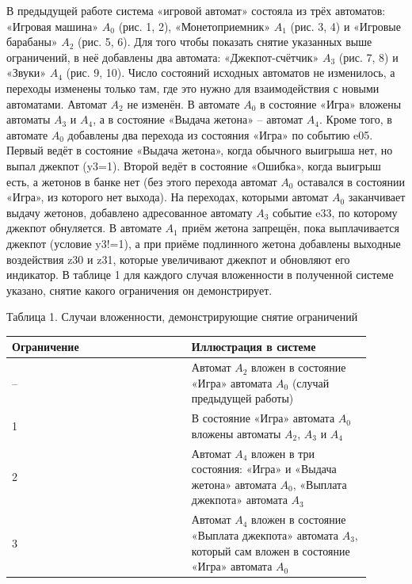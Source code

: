 \documentclass[12pt]{article}
\begin{document}
В предыдущей работе система «игровой автомат» состояла из трёх автоматов: «Игровая машина» $A_{0}$ (рис. 1, 2), «Монетоприемник» $A_{1}$ (рис. 3, 4) и «Игровые барабаны» $A_{2}$ (рис. 5, 6). Для того чтобы показать снятие указанных выше ограничений, в неё добавлены два автомата: «Джекпот-счётчик» $A_{3}$ (рис. 7, 8) и «Звуки» $A_{4}$ (рис. 9, 10). Число состояний исходных автоматов не изменилось, а переходы изменены только там, где это нужно для взаимодействия с новыми автоматами. Автомат $A_{2}$ не изменён. В автомате $A_{0}$ в состояние «Игра» вложены автоматы $A_{3}$ и $A_{4}$, а в состояние «Выдача жетона» – автомат $A_{4}$. Кроме того, в автомате $A_{0}$ добавлены два перехода из состояния «Игра» по событию e05. Первый ведёт в состояние «Выдача жетона», когда обычного выигрыша нет, но выпал джекпот (y3=1). Второй ведёт в состояние «Ошибка», когда выигрыш есть, а жетонов в банке нет (без этого перехода автомат $A_{0}$ оставался в состоянии «Игра», из которого нет выхода). На переходах, которыми автомат $A_{0}$ заканчивает выдачу жетонов, добавлено адресованное автомату $A_{3}$ событие e33, по которому джекпот обнуляется. В автомате $A_{1}$ приём жетона запрещён, пока выплачивается джекпот (условие y3!=1), а при приёме подлинного жетона добавлены выходные воздействия z30 и z31, которые увеличивают джекпот и обновляют его индикатор. В таблице 1 для каждого случая вложенности в полученной системе указано, снятие какого ограничения он демонстрирует.

Таблица 1. Случаи вложенности, демонстрирующие снятие ограничений

\begin{tabular}{|p{0.45\linewidth}|p{0.45\linewidth}|}
Ограничение &
Иллюстрация в системе \\ \hline
– &
Автомат $A_{2}$ вложен в состояние «Игра» автомата $A_{0}$ (случай предыдущей работы) \\ \hline
1 &
В состояние «Игра» автомата $A_{0}$ вложены автоматы $A_{2}$, $A_{3}$ и $A_{4}$ \\ \hline
2 &
Автомат $A_{4}$ вложен в три состояния: «Игра» и «Выдача жетона» автомата $A_{0}$, «Выплата джекпота» автомата $A_{3}$ \\ \hline
3 &
Автомат $A_{4}$ вложен в состояние «Выплата джекпота» автомата $A_{3}$, который сам вложен в состояние «Игра» автомата $A_{0}$ \\ \hline
\end{tabular}
\end{document}
